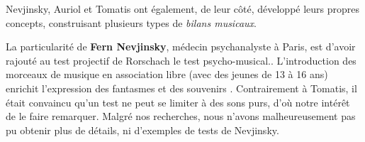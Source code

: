 



Nevjinsky, Auriol et Tomatis ont également, de leur côté, développé
leurs propres concepts, construisant plusieurs types 
de \emph{bilans musicaux}.

La particularité de \textbf{Fern Nevjinsky}, médecin psychanalyste à
  Paris, est d'avoir rajouté au test projectif de Rorschach le test psycho-musical.\autocite{nevjinsky:adolescence}.
L'introduction des morceaux de musique en association libre (avec
 des jeunes de 13 à 16 ans) enrichit l'expression des fantasmes et des
 souvenirs \autocite{nevjinsky:adolescence}. %
Contrairement à Tomatis,
 il était convaincu qu'un test ne peut 
se limiter à des sons purs, d'où notre intérêt de le faire remarquer. Malgré nos recherches, nous n'avons 
malheureusement pas pu obtenir plus de détails, ni d'exemples de tests de Nevjinsky.



